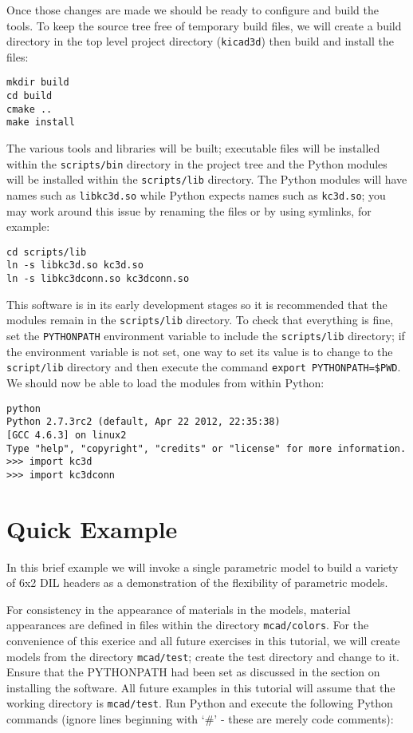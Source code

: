 \documentclass[a4paper, dvipdfm]{article}
\begin{document}
Once those changes are made we should be ready to configure and build the tools.
To keep the source tree free of temporary build files, we will create a build
directory in the top level project directory (\verb#kicad3d#) then build and install
the files:

\begin{verbatim}
mkdir build
cd build
cmake ..
make install
\end{verbatim}

The various tools and libraries will be built; executable files will be installed within
the \verb#scripts/bin# directory in the project tree and the Python modules will be
installed within the \verb#scripts/lib# directory. The Python modules will have names
such as \verb#libkc3d.so# while Python expects names such as \verb#kc3d.so#; you may work
around this issue by renaming the files or by using symlinks, for example:

\begin{verbatim}
cd scripts/lib
ln -s libkc3d.so kc3d.so
ln -s libkc3dconn.so kc3dconn.so
\end{verbatim}

This software is in its early development stages so it is recommended that the modules
remain in the \verb#scripts/lib# directory. To check that everything is fine, set the
\verb#PYTHONPATH# environment variable to include the \verb#scripts/lib# directory;
if the environment variable is not set, one way to set its value is to change to the
\verb#script/lib# directory and then execute the command \verb#export PYTHONPATH=$PWD#.
We should now be able to load the modules from within Python:

\begin{verbatim}
python
Python 2.7.3rc2 (default, Apr 22 2012, 22:35:38) 
[GCC 4.6.3] on linux2
Type "help", "copyright", "credits" or "license" for more information.
>>> import kc3d
>>> import kc3dconn
\end{verbatim}

\section{Quick Example}
\label{sec:quick-example}
In this brief example we will invoke a single parametric model to
build a variety of 6x2 DIL headers as a demonstration of the
flexibility of parametric models.

For consistency in the appearance of materials in the models, material
appearances are defined in files within the directory \verb#mcad/colors#.
For the convenience of this exerice and all future exercises in this
tutorial, we will create models from the directory \verb#mcad/test#;
create the test directory and change to it. Ensure that the PYTHONPATH
had been set as discussed in the section on installing the software.
All future examples in this tutorial will assume that the working
directory is \verb#mcad/test#.
Run Python and execute the following Python commands (ignore lines
beginning with `\#' - these are merely code comments):
\end{document}
